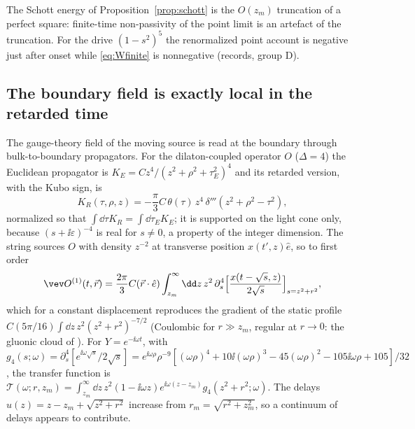 The Schott energy of Proposition~\ref{prop:schott} is the $O(z_m)$ truncation of a perfect square: finite-time
non-passivity of the point limit is an artefact of the truncation. For the drive $(1-s^2)^5$ the renormalized point
account is negative just after onset while \eqref{eq:Wfinite} is nonnegative (records, group D).

\subsection{The boundary field is exactly local in the retarded time}

The gauge-theory field of the moving source is read at the boundary through bulk-to-boundary propagators. For the
dilaton-coupled operator $O$ ($\Delta=4$) the Euclidean propagator is $K_E=Cz^4/(z^2+\rho^2+\tau_E^2)^4$ and its
retarded version, with the Kubo sign, is
\begin{equation}
K_R(\tau,\rho,z)=-\frac\pi3C\,\theta(\tau)\,z^4\,\delta'''(z^2+\rho^2-\tau^2),
\end{equation}
normalized so that $\int\dd\tau K_R=\int\dd\tau_EK_E$; it is supported on the light cone only, because
$(s+\ii\varepsilon)^{-4}$ is real for $s\ne0$, a property of the integer dimension. The string sources $O$ with
density $z^{-2}$ at transverse position $x(t',z)\hat e$, so to first order
\begin{equation}
\vev O^{(1)}(t,\vec r)=\frac{2\pi}3C(\vec r\cdot\hat e)\int_{z_m}^\infty\dd z\,z^2\,\partial_s^4\Big[\frac{x(t-\sqrt s,z)}{2\sqrt s}\Big]_{s=z^2+r^2},
\end{equation}
which for a constant displacement reproduces the gradient of the static profile $C(5\pi/16)\int\dd z\,z^2(z^2+r^2)^{-7/2}$
(Coulombic for $r\gg z_m$, regular at $r\to0$: the gluonic cloud of \cite{CGGjhep}). For $Y=e^{-\ii\omega t}$, with
$g_4(s;\omega)=\partial_s^4[e^{\ii\omega\sqrt s}/2\sqrt s]=e^{\ii\omega\rho}\rho^{-9}[(\omega\rho)^4+10\ii(\omega\rho)^3-45(\omega\rho)^2-105\ii\omega\rho+105]/32$,
the transfer function is
$\mathcal T(\omega;r,z_m)=\int_{z_m}^\infty\dd z\,z^2(1-\ii\omega z)e^{\ii\omega(z-z_m)}g_4(z^2+r^2;\omega)$. The delays
$u(z)=z-z_m+\sqrt{z^2+r^2}$ increase from $r_m=\sqrt{r^2+z_m^2}$, so a continuum of delays appears to contribute.

